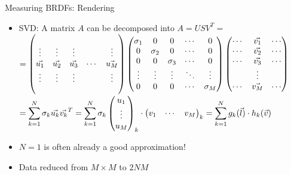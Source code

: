 \documentclass[utf8,stillsansserifmath,fleqn,t]{beamer}
\begin{document}
\begin{frame}[label=materials-brdf-factorization]
\frametitle{\insertsection}
Measuring BRDFs: Rendering
\begin{itemize}
\item SVD: A matrix $A$ can be decomposed into $A = USV^T =$\\[1ex]
        $=
        \begin{pmatrix}
         &&&&\\
         \vdots    & \vdots    & \vdots    &        & \vdots\\
         \vec{u_1} & \vec{u_2} & \vec{u_3} & \cdots & \vec{u_M}\\ 
         \vdots    & \vdots    & \vdots    &        & \vdots\\
         &&&&\\
        \end{pmatrix}
        \begin{pmatrix}
         \sigma_1  & 0        & 0        & \cdots & 0\\
         0         & \sigma_2 & 0        & \cdots & 0\\
         0         & 0        & \sigma_3 & \cdots & 0\\
         \vdots    & \vdots   & \vdots   & \ddots & \vdots\\
         0         & 0        & 0        & \cdots & \sigma_M\\
        \end{pmatrix}
        \begin{pmatrix}
         \cdots & \vec{v_1} & \cdots\\
         \cdots & \vec{v_2} & \cdots\\
         \cdots & \vec{v_3} & \cdots\\
                & \vdots    &       \\
         \cdots & \vec{v_M} & \cdots\\
        \end{pmatrix}\hspace*{-10em}
        $\\[1ex]
        $\displaystyle = \sum_{k=1}^N \sigma_k\vec{u_k}\vec{v_k}^T
        = \sum_{k=1}^N \sigma_k
        \begin{pmatrix}
        u_1\\ \vdots\\u_M
        \end{pmatrix}_k\cdot
        \begin{pmatrix}
        v_1&\cdots&v_M
        \end{pmatrix}_k
        = \sum_{k=1}^{N}g_k(\vec{l})\cdot h_k(\vec{v})
        \hspace*{-10em}$
\item $N=1$ is often already a good approximation!
\item Data reduced from $M\times M$ to $2NM$
\end{itemize}
\end{frame}
\end{document}
